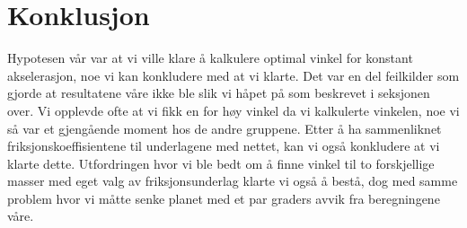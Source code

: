 \documentclass[10pt,a4paper]{report}
\begin{document}
\chapter*{Konklusjon}
Hypotesen vår var at vi ville klare å kalkulere optimal vinkel for konstant akselerasjon, noe vi kan konkludere med at vi klarte. Det var en del feilkilder som gjorde at resultatene våre ikke ble slik vi håpet på som beskrevet i seksjonen over. Vi opplevde ofte at vi fikk en for høy vinkel da vi kalkulerte vinkelen, noe vi så var et gjengående moment hos de andre gruppene. Etter å ha sammenliknet friksjonskoeffisientene til underlagene med nettet, kan vi også konkludere at vi klarte dette. Utfordringen hvor vi ble bedt om å finne vinkel til to forskjellige masser med eget valg av friksjonsunderlag klarte vi også å bestå, dog med samme problem hvor vi måtte senke planet med et par graders avvik fra beregningene våre. 
\end{document}

